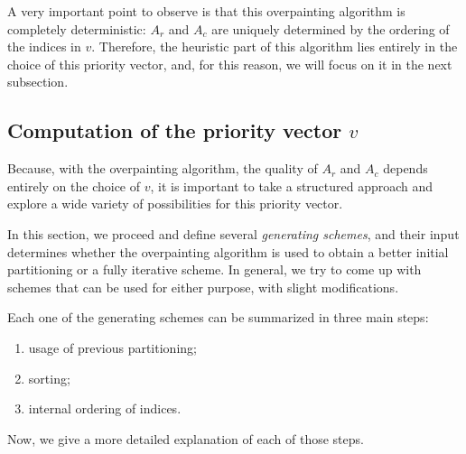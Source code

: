 A very important point to observe is that this overpainting algorithm is completely deterministic: $A_r$ and $A_c$ are uniquely determined by the ordering of the indices in $v$. Therefore, the heuristic part of this algorithm lies entirely in the choice of this priority vector, and, for this reason, we will focus on it in the next subsection. 

\subsection{Computation of the priority vector $v$}

Because, with the overpainting algorithm, the quality of $A_r$ and $A_c$ depends entirely on the choice of $v$, it is important to take a structured approach and explore a wide variety of possibilities for this priority vector.

In this section, we proceed and define several \emph{generating schemes}, and their input determines whether the overpainting algorithm is used to obtain a better initial partitioning or a fully iterative scheme. In general, we try to come up with schemes that can be used for either purpose, with slight modifications. 

Each one of the generating schemes can be summarized in three main steps:

\begin{enumerate}
	\item usage of previous partitioning;
	\item sorting;
	\item internal ordering of indices.
\end{enumerate}

Now, we give a more detailed explanation of each of those steps. 

